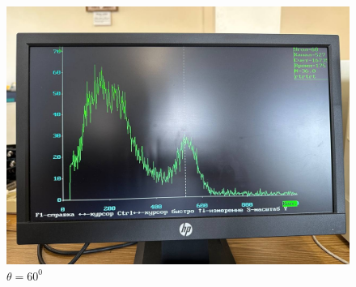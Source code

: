 \documentclass[a4paper, 12pt]{article}
\begin{document}
\begin{figure}[H]
\begin{minipage}[h]{0.3\linewidth}
        \includegraphics[width = 1\linewidth]{res/07.jpg}
        \caption{$\theta = 60^0$}
    \end{minipage}
    \end{figure}
\end{document}

